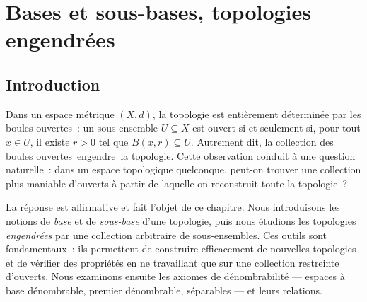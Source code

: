 \documentclass[12pt,a4paper,openany]{book}
\theoremstyle{definition}
\theoremstyle{cours}
\theoremstyle{coursnormal}
\providecommand{\og}{\guillemotleft\,}
\providecommand{\fg}{\,\guillemotright}
\begin{document}
\chapter{Bases et sous-bases, topologies engendrées}\label{ch:bases-sousbases}

\section*{Introduction}

Dans un espace métrique $(X,d)$, la topologie est entièrement déterminée par
les boules ouvertes~: un sous-ensemble $U\subseteq X$ est ouvert si et
seulement si, pour tout $x\in U$, il existe $r>0$ tel que $B(x,r)\subseteq U$.
Autrement dit, la collection des boules ouvertes \og{}engendre\fg{} la
topologie. Cette observation conduit à une question naturelle~: dans un espace
topologique quelconque, peut-on trouver une collection plus maniable d'ouverts
à partir de laquelle on reconstruit toute la topologie~?

\medskip

La réponse est affirmative et fait l'objet de ce chapitre. Nous introduisons
les notions de \emph{base} et de \emph{sous-base} d'une topologie, puis nous
étudions les topologies \emph{engendrées} par une collection arbitraire de
sous-ensembles. Ces outils sont fondamentaux~: ils permettent de construire
efficacement de nouvelles topologies et de vérifier des propriétés en ne
travaillant que sur une collection restreinte d'ouverts. Nous examinons ensuite
les axiomes de dénombrabilité --- espaces à base dénombrable, premier
dénombrable, séparables --- et leurs relations.

\begin{center}
\label{fig:base-elements}
\end{center}
\end{document}
